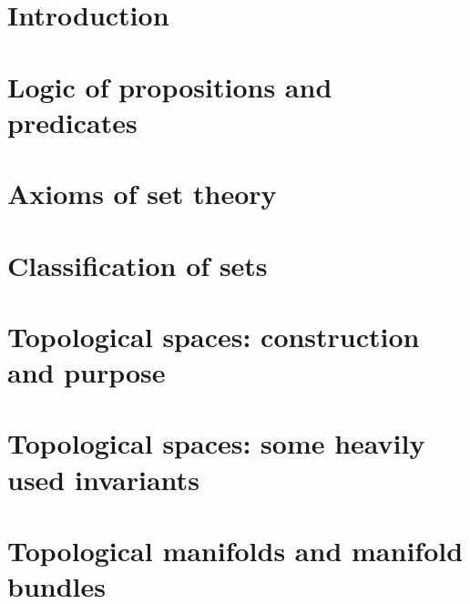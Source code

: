 \documentclass[
11pt, %
a4paper, %
oneside, %
headinclude,footinclude, %
]{scrartcl}
\begin{document}


\newpage %


\section*{Introduction}


\section{Logic of propositions and predicates}


\section{Axioms of set theory}


\section{Classification of sets}


\section{Topological spaces: construction and purpose}



\section{Topological spaces: some heavily used invariants}



\section{Topological manifolds and manifold bundles}
\end{document}
